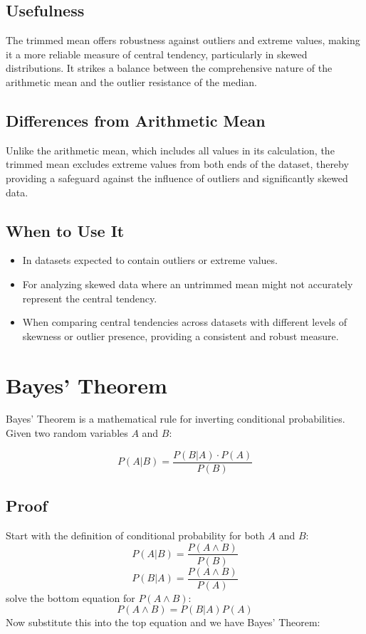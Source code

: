 \documentclass[12pt]{article}
\begin{document}
\subsection{Usefulness}

The trimmed mean offers robustness against outliers and extreme values, making it a more reliable measure of central tendency, particularly in skewed distributions. It strikes a balance between the comprehensive nature of the arithmetic mean and the outlier resistance of the median.

\subsection{Differences from Arithmetic Mean}

Unlike the arithmetic mean, which includes all values in its calculation, the trimmed mean excludes extreme values from both ends of the dataset, thereby providing a safeguard against the influence of outliers and significantly skewed data.

\subsection{When to Use It}

\begin{itemize}
    \item In datasets expected to contain outliers or extreme values.
    \item For analyzing skewed data where an untrimmed mean might not accurately represent the central tendency.
    \item When comparing central tendencies across datasets with different levels of skewness or outlier presence, providing a consistent and robust measure.
\end{itemize}
\section{Bayes' Theorem}
Bayes' Theorem is a mathematical rule for inverting conditional probabilities. Given two random variables \(A\) and \(B\):

\[P(A|B) = \frac{P(B|A)\cdot P(A)}{P(B)}\]

\subsection{Proof}
Start with the definition of conditional probability for both \(A\) and \(B\):
\[P(A|B) = \frac{P(A \land B)}{P(B)}\]
\[P(B|A) = \frac{P(A \land B)}{P(A)}\]
solve the bottom equation for \(P(A \land B)\):
\[P(A \land B) = P(B|A)P(A)\]
Now substitute this into the top equation and we have Bayes' Theorem:
\end{document}
